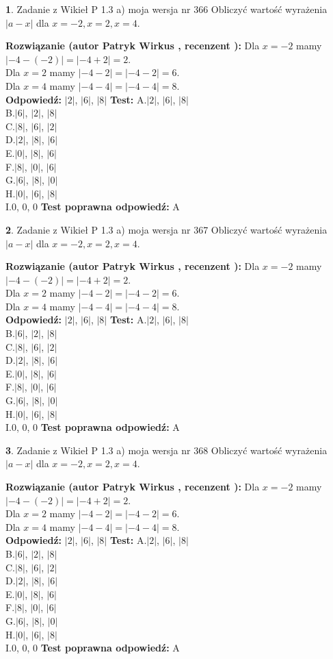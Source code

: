 \documentclass[12pt, a4paper]{article}
\theoremstyle{definition} %
\newtheorem{zad}{}
\newcommand{\zadStart}[1]{\begin{zad}#1\newline}
\newcommand{\zadStop}{\end{zad}}
\newcommand{\rozwStart}[2]{\noindent \textbf{Rozwiązanie (autor #1 , recenzent #2): }\newline}
\newcommand{\rozwStop}{\newline}
\newcommand{\odpStart}{\noindent \textbf{Odpowiedź:}\newline}
\newcommand{\odpStop}{\newline}
\newcommand{\testStart}{\noindent \textbf{Test:}\newline}
\newcommand{\testStop}{\newline}
\newcommand{\kluczStart}{\noindent \textbf{Test poprawna odpowiedź:}\newline}
\newcommand{\kluczStop}{\newline}
\begin{document}
\zadStart{Zadanie z Wikieł P 1.3 a) moja wersja nr 366}
Obliczyć wartość wyrażenia $|a - x|$ dla $x=-2,x=2,x=4$.
\zadStop
\rozwStart{Patryk Wirkus}{}
Dla $x = -2$ mamy $|-4 - (-2)| = |-4 + 2| = 2$.\\
Dla $x = 2$ mamy $|-4 - 2| = |-4 - 2| = 6$.\\
Dla $x = 4$ mamy $|-4 - 4| = |-4 - 4| = 8$.\\
\rozwStop
\odpStart
$|2|$, $|6|$, $|8|$
\odpStop
\testStart
A.$|2|$, $|6|$, $|8|$\\
B.$|6|$, $|2|$, $|8|$\\
C.$|8|$, $|6|$, $|2|$\\
D.$|2|$, $|8|$, $|6|$\\
E.$|0|$, $|8|$, $|6|$\\
F.$|8|$, $|0|$, $|6|$\\
G.$|6|$, $|8|$, $|0|$\\
H.$|0|$, $|6|$, $|8|$\\
I.$0$, $0$, $0$
\testStop
\kluczStart
A
\kluczStop



\zadStart{Zadanie z Wikieł P 1.3 a) moja wersja nr 367}
Obliczyć wartość wyrażenia $|a - x|$ dla $x=-2,x=2,x=4$.
\zadStop
\rozwStart{Patryk Wirkus}{}
Dla $x = -2$ mamy $|-4 - (-2)| = |-4 + 2| = 2$.\\
Dla $x = 2$ mamy $|-4 - 2| = |-4 - 2| = 6$.\\
Dla $x = 4$ mamy $|-4 - 4| = |-4 - 4| = 8$.\\
\rozwStop
\odpStart
$|2|$, $|6|$, $|8|$
\odpStop
\testStart
A.$|2|$, $|6|$, $|8|$\\
B.$|6|$, $|2|$, $|8|$\\
C.$|8|$, $|6|$, $|2|$\\
D.$|2|$, $|8|$, $|6|$\\
E.$|0|$, $|8|$, $|6|$\\
F.$|8|$, $|0|$, $|6|$\\
G.$|6|$, $|8|$, $|0|$\\
H.$|0|$, $|6|$, $|8|$\\
I.$0$, $0$, $0$
\testStop
\kluczStart
A
\kluczStop



\zadStart{Zadanie z Wikieł P 1.3 a) moja wersja nr 368}
Obliczyć wartość wyrażenia $|a - x|$ dla $x=-2,x=2,x=4$.
\zadStop
\rozwStart{Patryk Wirkus}{}
Dla $x = -2$ mamy $|-4 - (-2)| = |-4 + 2| = 2$.\\
Dla $x = 2$ mamy $|-4 - 2| = |-4 - 2| = 6$.\\
Dla $x = 4$ mamy $|-4 - 4| = |-4 - 4| = 8$.\\
\rozwStop
\odpStart
$|2|$, $|6|$, $|8|$
\odpStop
\testStart
A.$|2|$, $|6|$, $|8|$\\
B.$|6|$, $|2|$, $|8|$\\
C.$|8|$, $|6|$, $|2|$\\
D.$|2|$, $|8|$, $|6|$\\
E.$|0|$, $|8|$, $|6|$\\
F.$|8|$, $|0|$, $|6|$\\
G.$|6|$, $|8|$, $|0|$\\
H.$|0|$, $|6|$, $|8|$\\
I.$0$, $0$, $0$
\testStop
\kluczStart
A
\kluczStop
\end{document}
